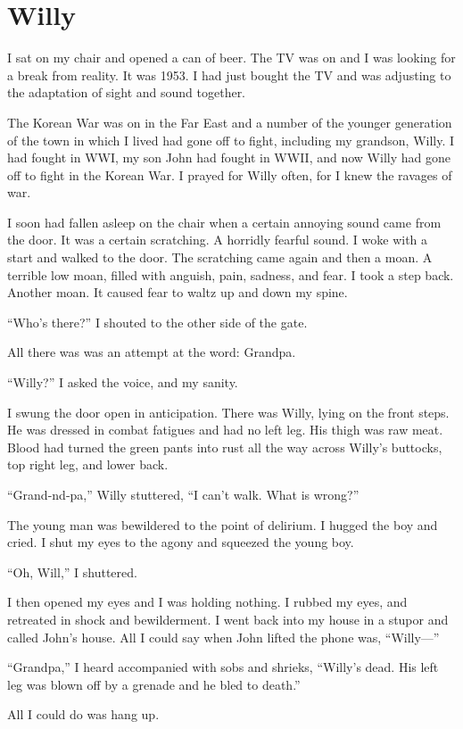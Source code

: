 \chapter{Willy}

I sat on my chair and opened a can of beer. The TV was on and I was
looking for a break from reality. It was 1953. I had just bought the TV
and was adjusting to the adaptation of sight and sound together.

The Korean War was on in the Far East and a number of the younger
generation of the town in which I lived had gone off to fight, including
my grandson, Willy. I had fought in WWI, my son John had fought in WWII,
and now Willy had gone off to fight in the Korean War. I prayed for
Willy often, for I knew the ravages of war.

I soon had fallen asleep on the chair when a certain annoying sound came
from the door. It was a certain scratching. A horridly fearful sound. I
woke with a start and walked to the door. The scratching came again and
then a moan. A terrible low moan, filled with anguish, pain, sadness,
and fear. I took a step back. Another moan. It caused fear to waltz up
and down my spine.

``Who's there?'' I shouted to the other side of the gate.

All there was was an attempt at the word: Grandpa.

``Willy?'' I asked the voice, and my sanity.

I swung the door open in anticipation. There was Willy, lying on the
front steps. He was dressed in combat fatigues and had no left leg. His
thigh was raw meat. Blood had turned the green pants into rust all the
way across Willy's buttocks, top right leg, and lower back.

``Grand-nd-pa,'' Willy stuttered, ``I can't walk. What is wrong?''

The young man was bewildered to the point of delirium. I hugged the boy
and cried. I shut my eyes to the agony and squeezed the young boy.

``Oh, Will,'' I shuttered.

I then opened my eyes and I was holding nothing. I rubbed my eyes, and
retreated in shock and bewilderment. I went back into my house in a
stupor and called John's house. All I could say when John lifted the
phone was, ``Willy---''

``Grandpa,'' I heard accompanied with sobs and shrieks, ``Willy's dead. His
left leg was blown off by a grenade and he bled to death.''

All I could do was hang up.
